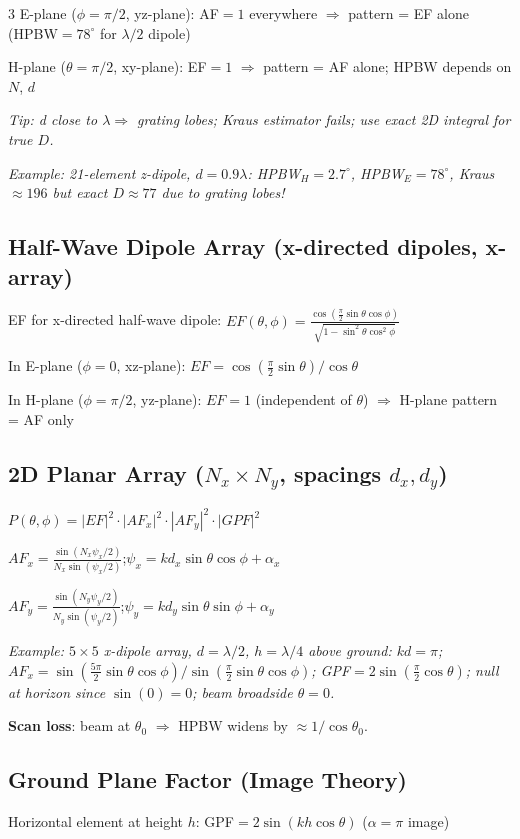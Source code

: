 \documentclass[6pt,landscape]{article}
\begin{document}
\begin{multicols}{3}
E-plane ($\phi=\pi/2$, yz-plane): AF$=1$ everywhere $\Rightarrow$ pattern = EF alone (HPBW$=78^\circ$ for $\lambda/2$ dipole)

H-plane ($\theta=\pi/2$, xy-plane): EF$=1$ $\Rightarrow$ pattern = AF alone; HPBW depends on $N$, $d$

\textit{Tip: d close to $\lambda\Rightarrow$ grating lobes; Kraus estimator fails; use exact 2D integral for true $D$.}

\textit{Example: 21-element z-dipole, $d=0.9\lambda$: HPBW$_H=2.7^\circ$, HPBW$_E=78^\circ$, Kraus$\approx196$ but exact $D\approx77$ due to grating lobes!}

\subsection*{Half-Wave Dipole Array (x-directed dipoles, x-array)}
EF for x-directed half-wave dipole: $EF(\theta,\phi)=\frac{\cos(\frac{\pi}{2}\sin\theta\cos\phi)}{\sqrt{1-\sin^2\theta\cos^2\phi}}$

In E-plane ($\phi=0$, xz-plane): $EF=\cos(\frac{\pi}{2}\sin\theta)/\cos\theta$

In H-plane ($\phi=\pi/2$, yz-plane): $EF=1$ (independent of $\theta$) $\Rightarrow$ H-plane pattern = AF only

\subsection*{2D Planar Array ($N_x\times N_y$, spacings $d_x,d_y$)}
$P(\theta,\phi)=|EF|^2\cdot|AF_x|^2\cdot|AF_y|^2\cdot|GPF|^2$

$AF_x=\frac{\sin(N_x\psi_x/2)}{N_x\sin(\psi_x/2)}$;\quad$\psi_x=kd_x\sin\theta\cos\phi+\alpha_x$

$AF_y=\frac{\sin(N_y\psi_y/2)}{N_y\sin(\psi_y/2)}$;\quad$\psi_y=kd_y\sin\theta\sin\phi+\alpha_y$

\textit{Example: $5\times5$ x-dipole array, $d=\lambda/2$, $h=\lambda/4$ above ground:
$kd=\pi$; $AF_x=\sin(\frac{5\pi}{2}\sin\theta\cos\phi)/\sin(\frac{\pi}{2}\sin\theta\cos\phi)$;
GPF$=2\sin(\frac{\pi}{2}\cos\theta)$; null at horizon since $\sin(0)=0$; beam broadside $\theta=0$.}

\textbf{Scan loss}: beam at $\theta_0$ $\Rightarrow$ HPBW widens by $\approx1/\cos\theta_0$.

\subsection*{Ground Plane Factor (Image Theory)}
Horizontal element at height $h$: GPF$=2\sin(kh\cos\theta)$ ($\alpha=\pi$ image)


\end{multicols}
\end{document}
